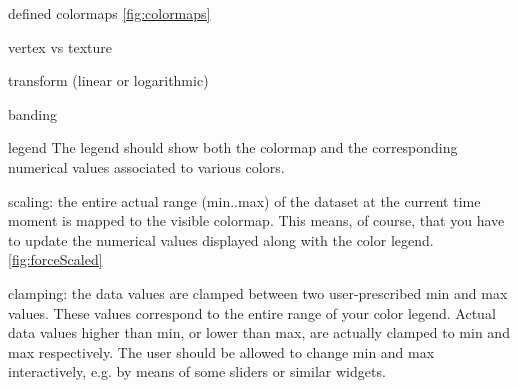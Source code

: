 defined colormaps \ref{fig:colormaps}
 
vertex vs texture

transform (linear or logarithmic)

banding 

legend  The legend should show both the colormap and the corresponding numerical values associated to various colors.

scaling: the entire actual range (min..max) of the dataset at the current time moment is mapped to the visible colormap. This means, of course, that you have to update the numerical values displayed along with the color legend.
\ref{fig:forceScaled}

clamping: the data values are clamped between two user-prescribed min and max values. These values correspond to the entire range of your color legend. Actual data values higher than min, or lower than max, are actually clamped to min and max respectively. The user should be allowed to change min and max interactively, e.g. by means of some sliders or similar widgets.
 



